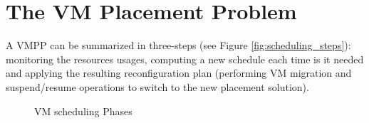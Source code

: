 \section{The VM Placement Problem}
\label{sec:vmpp}

A VMPP can be summarized in three-steps (see Figure
\ref{fig:scheduling_steps}): monitoring the resources usages,
computing a new schedule each time is it needed and applying the
resulting reconfiguration plan (\ie performing VM migration and
suspend/resume operations to switch to the new placement solution).

\begin{figure}[ht]
\vspace*{-.2cm}
\begin{center}
        \subcapcentertrue
\vspace*{-.2cm}
\caption{VM scheduling Phases}
\end{center}
\label{fig:scheduling}
\vspace*{-.2cm}
\end{figure}
%

